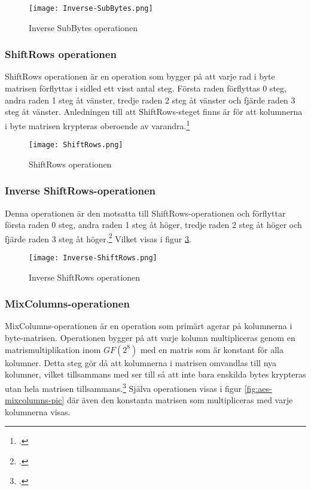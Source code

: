 \begin{figure}[H]
    \centering
    \texttt{[image: Inverse-SubBytes.png]}
    \caption{Inverse SubBytes operationen}
    \label{fig:aes-inverse-subbytes-pic}
\end{figure}

\subsubsection{ShiftRows operationen}
\label{sec:aes-shiftrows}

ShiftRows operationen är en operation som bygger på att varje rad i \gls{byte} matrisen förflyttas i sidled ett visst antal steg.
Första raden förflyttas 0 steg, andra raden 1 steg åt vänster, tredje raden 2 steg åt vänster och fjärde raden 3 steg åt vänster. Anledningen till att ShiftRows-steget
finns är för att kolumnerna i \gls{byte} matrisen krypteras oberoende av varandra.\footcite{daemen1999aes}

\begin{figure}[H]
    \centering
    \texttt{[image: ShiftRows.png]}
    \caption{ShiftRows operationen}
    \label{fig:aes-shiftrows-pic}
\end{figure}

\subsubsection{Inverse ShiftRows-operationen}
\label{sec:aes-invers-shiftrows}

Denna operationen är den motsatta till ShiftRows-operationen och förflyttar
första raden 0 steg, andra raden 1 steg åt höger, tredje raden 2 steg åt höger och fjärde raden 3 steg åt höger.\footcite{daemen1999aes}
Vilket visas i figur \ref{fig:aes-inverse-shiftrows-pic}.

\begin{figure}[H]
    \centering
    \texttt{[image: Inverse-ShiftRows.png]}
    \caption{Inverse ShiftRows operationen}
    \label{fig:aes-inverse-shiftrows-pic}
\end{figure}

\subsubsection{MixColumns-operationen}
\label{sec:aes-mixcolumns}

MixColumns-operationen är en operation som primärt agerar på kolumnerna i \gls{byte}-matrisen. Operationen bygger på att varje kolumn multipliceras genom en
\gls{matrismultiplikation} inom \hyperref[sec:finite-fields]{$GF(2^8)$} med en matris som är konstant för alla kolumner. Detta steg gör då att kolumnerna i matrisen omvandlas till nya kolumner,
vilket tillsammans med  ser till så att inte bara enskilda bytes krypteras utan hela matrisen tillsammans.\footcite{daemen1999aes} Själva operationen visas i figur \ref{fig:aes-mixcolumns-pic}
där även den konstanta matrisen som multipliceras med varje kolumnerna visas.

